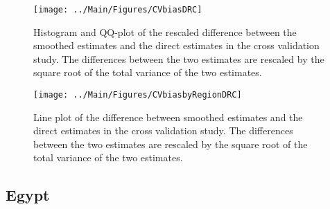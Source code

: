 \documentclass[12pt]{article}\usepackage[]{graphicx}\usepackage[]{color}
\newenvironment{knitrout}{}{} %
\begin{document}
\begin{knitrout}
\color{fgcolor}\begin{figure}[bht]

{\centering \texttt{[image: ../Main/Figures/CVbiasDRC]} 

}

\caption[Histogram and QQ-plot of the rescaled difference between the smoothed estimates and the direct estimates in the cross validation study]{Histogram and QQ-plot of the rescaled difference between the smoothed estimates and the direct estimates in the cross validation study. The differences between the two estimates are rescaled by the square root of the total variance of the two estimates.}\label{fig:unnamed-chunk-99}
\end{figure}


\end{knitrout}

\begin{knitrout}
\color{fgcolor}\begin{figure}[bht]

{\centering \texttt{[image: ../Main/Figures/CVbiasbyRegionDRC]} 

}

\caption[Line plot of the difference between smoothed estimates and the direct estimates in the cross validation study]{Line plot of the difference between smoothed estimates and the direct estimates in the cross validation study. The differences between the two estimates are rescaled by the square root of the total variance of the two estimates.}\label{fig:unnamed-chunk-100}
\end{figure}


\end{knitrout}


\clearpage
\subsection{Egypt}


\end{document}
